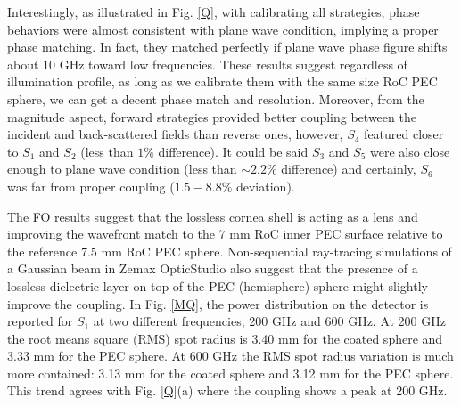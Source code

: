\documentclass{osa-article}
\begin{document}
Interestingly, as illustrated in Fig. \ref{Q}, with calibrating all strategies, phase behaviors were almost consistent with plane wave condition, implying a proper phase matching. In fact, they matched perfectly if plane wave phase figure shifts about $10$ GHz toward low frequencies. These results suggest regardless of illumination profile, as long as we calibrate them with the same size RoC PEC sphere, we can get a decent phase match and resolution.
Moreover, from the magnitude aspect, forward strategies provided better coupling between the incident and back-scattered fields than reverse ones, however, $S_4$ featured closer to $S_1$ and $S_2$ (less than $1 \%$ difference). It could be said $S_3$ and $S_5$ were also close enough to plane wave condition (less than $\sim 2.2 \%$ difference) and certainly, $S_6$ was far from proper coupling ($1.5-8.8 \%$ deviation). 

The FO results suggest that the lossless cornea shell is acting as a lens and improving the wavefront match to the $7$ mm RoC inner PEC surface relative to the reference $7.5$ mm RoC PEC sphere.
Non-sequential ray-tracing simulations of a Gaussian beam in Zemax OpticStudio also suggest that the presence of a lossless dielectric layer on top of the PEC (hemisphere) sphere might slightly improve the coupling. In Fig. \ref{MQ}, the power distribution on the detector is reported for $S_1$ at two different frequencies, 200 GHz and 600 GHz. At 200 GHz the root means square (RMS) spot radius is 3.40 mm for the coated sphere and 3.33 mm for the PEC sphere. At 600 GHz the RMS spot radius variation is much more contained: 3.13 mm for the coated sphere and 3.12 mm for the PEC sphere. This trend agrees with Fig. \ref{Q}(a) where the coupling shows a peak at 200 GHz.
%
\end{document}
